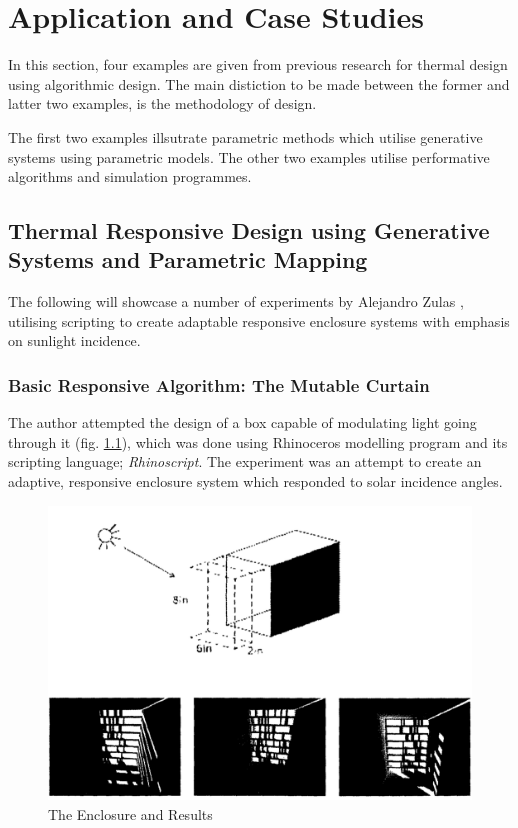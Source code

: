 \chapter{Application and Case Studies}

In this section, four examples are given from previous research for thermal design using algorithmic design. The main distiction to be made between the former and latter two examples, is the methodology of design.

The first two examples illsutrate parametric methods which utilise generative systems using parametric models. The other two examples utilise performative algorithms and simulation programmes.


\section{Thermal Responsive Design using Generative Systems and Parametric Mapping}
\label{sec:zulas}
The following will showcase a number of experiments by Alejandro Zulas \cite{zulas04}, utilising scripting to create adaptable responsive enclosure systems with emphasis on sunlight incidence.

\subsection{Basic Responsive Algorithm: The Mutable Curtain}

The author attempted the design of a box capable of modulating light going through it (fig. \ref{fig:AZulasEncl}), which was done using Rhinoceros modelling program and its scripting language; \emph{Rhinoscript}. The experiment was an attempt to create an adaptive, responsive enclosure system which responded to solar incidence angles. 

\begin{figure}[htbp]
\centering
\includegraphics[width=\textwidth]{./Images/1-Enclosure}
\caption[Responsive Adaptable Enclosure Experiment]{The Enclosure and Results \cite{zulas04}}
\label{fig:AZulasEncl}
\end{figure}

